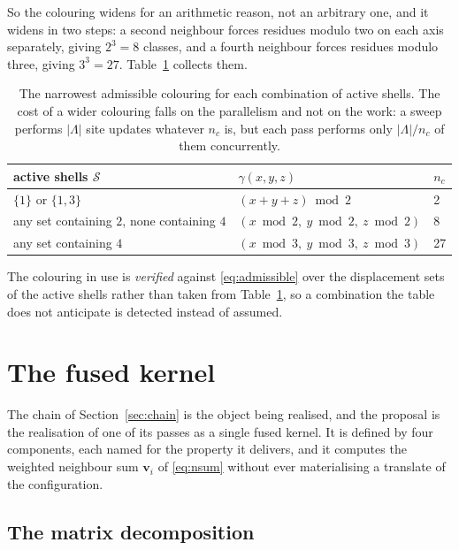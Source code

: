 \documentclass[11pt,a4paper]{article}
\newcommand{\shells}{\mathcal{S}}
\begin{document}
So the colouring widens for an arithmetic reason, not an arbitrary one, and it
widens in two steps: a second neighbour forces residues modulo two on each axis
separately, giving $2^3 = 8$ classes, and a fourth neighbour forces residues
modulo three, giving $3^3 = 27$. Table~\ref{tab:colourings} collects them.

\begin{table}[htbp]
\centering
\caption{The narrowest admissible colouring for each combination of active
shells. The cost of a wider colouring falls on the parallelism and not on the
work: a sweep performs $|\Lambda|$ site updates whatever $n_c$ is, but each pass
performs only $|\Lambda| / n_c$ of them concurrently.}
\label{tab:colourings}
\begin{tabular}{lll}
\toprule
active shells $\shells$ & $\gamma(x,y,z)$ & $n_c$ \\
\midrule
$\{1\}$ or $\{1,3\}$ & $(x+y+z) \bmod 2$ & 2 \\
any set containing $2$, none containing $4$
  & $(x \bmod 2,\ y \bmod 2,\ z \bmod 2)$ & 8 \\
any set containing $4$
  & $(x \bmod 3,\ y \bmod 3,\ z \bmod 3)$ & 27 \\
\bottomrule
\end{tabular}
\end{table}

The colouring in use is \emph{verified} against \eqref{eq:admissible} over the
displacement sets of the active shells rather than taken from
Table~\ref{tab:colourings}, so a combination the table does not anticipate is
detected instead of assumed.

\section{The fused kernel}
\label{sec:proposal}

The chain of Section~\ref{sec:chain} is the object being realised, and the
proposal is the realisation of one of its passes as a single fused kernel. It is
defined by four components, each named for the property it delivers, and it
computes the weighted neighbour sum $\mathbf{v}_i$ of \eqref{eq:nsum} without
ever materialising a translate of the configuration.

\subsection{The matrix decomposition}
\label{sec:matrices}
\end{document}
